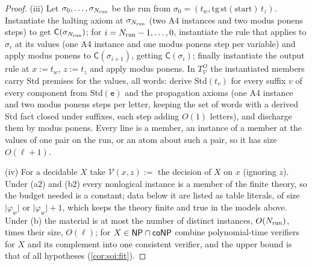 \begin{proof}
(iii) Let $\sigma_0,\dots,\sigma_{N_{\rm run}}$ be the run from $\sigma_0=(t_w,\mathrm{tg}\,\mathrm{st}(\mathrm{start})\,t_z)$. Instantiate the halting axiom at $\sigma_{N_{\rm run}}$ (two A4 instances and two modus ponens steps) to get $\mathsf C(\sigma_{N_{\rm run}})$; for $i=N_{\rm run}-1,\dots,0$, instantiate the rule that applies to $\sigma_i$ at its values (one A4 instance and one modus ponens step per variable) and apply modus ponens to $\mathsf C(\sigma_{i+1})$, getting $\mathsf C(\sigma_i)$; finally instantiate the output rule at $x:=t_w$, $z:=t_z$ and apply modus ponens. In $T^O_{\mathcal V}$ the instantiated members carry $\mathrm{Std}$ premises for the values, all words: derive $\mathrm{Std}(t_v)$ for every suffix $v$ of every component from $\mathrm{Std}(\mathtt e)$ and the propagation axioms (one A4 instance and two modus ponens steps per letter, keeping the set of words with a derived $\mathrm{Std}$ fact closed under suffixes, each step adding $O(1)$ letters), and discharge them by modus ponens. Every line is a member, an instance of a member at the values of one pair on the run, or an atom about such a pair, so it has size $O(\ell+1)$.

(iv) For a decidable $X$ take $\mathcal V(x,z):=$ the decision of $X$ on $x$ (ignoring $z$). Under (a2) and (b2) every nonlogical instance is a member of the finite theory, so the budget needed is a constant; data below it are listed as table literals, of size $\lvert\varphi_w\rvert$ or $\lvert\varphi_w\rvert+1$, which keeps the theory finite and true in the models above. Under (b) the material is at most the number of distinct instances, $O(N_{\rm run})$, times their size, $O(\ell)$; for $X\in\mathsf{NP}\cap\mathsf{coNP}$ combine polynomial-time verifiers for $X$ and its complement into one consistent verifier, and the upper bound is that of all hypotheses (\cref{cor:soi:fit}).


\end{proof}
